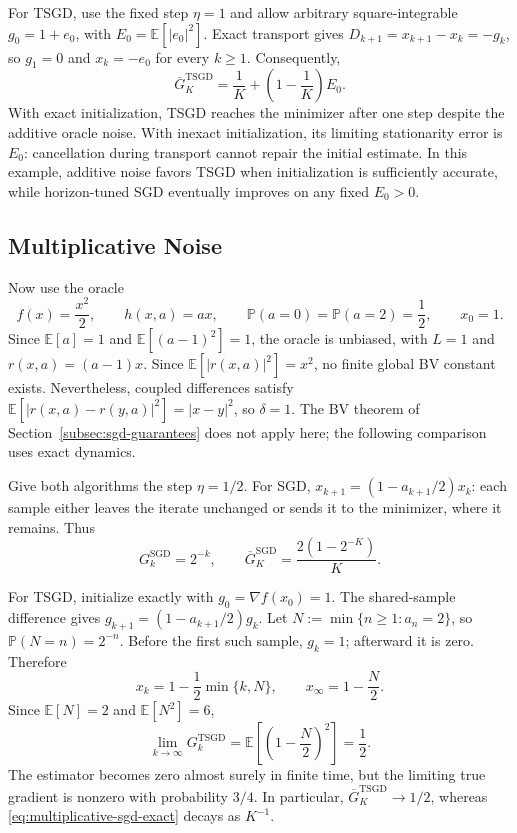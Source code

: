 For TSGD, use the fixed step $\eta=1$ and allow arbitrary
square-integrable $g_0=1+e_0$, with
$E_0=\mathbb E[|e_0|^2]$. Exact transport gives
$D_{k+1}=x_{k+1}-x_k=-g_k$, so $g_1=0$ and
$x_k=-e_0$ for every $k\geq1$. Consequently,
\begin{equation}
\label{eq:additive-tsgd-exact}
\boxed{\overline G_K^{\mathrm{TSGD}}
=\frac1K+\left(1-\frac1K\right)E_0.}
\end{equation}
With exact initialization, TSGD reaches the minimizer after one
step despite the additive oracle noise. With inexact initialization,
its limiting stationarity error is $E_0$: cancellation during
transport cannot repair the initial estimate. In this example,
additive noise favors TSGD when initialization is sufficiently
accurate, while horizon-tuned SGD eventually improves on any fixed
$E_0>0$.

\subsection{Multiplicative Noise}
\label{subsec:multiplicative-noise-comparison}

Now use the oracle
\begin{equation}
\label{eq:multiplicative-comparison-oracle}
f(x)=\frac{x^2}{2},\qquad
h(x,a)=a x,\qquad
\mathbb P(a=0)=\mathbb P(a=2)=\frac12,\qquad x_0=1.
\end{equation}
Since $\mathbb E[a]=1$ and $\mathbb E[(a-1)^2]=1$, the oracle is
unbiased, with $L=1$ and $r(x,a)=(a-1)x$. Since
$\mathbb E[|r(x,a)|^2]=x^2$, no finite global BV constant exists.
Nevertheless, coupled differences satisfy
$\mathbb E[|r(x,a)-r(y,a)|^2]=|x-y|^2$, so $\delta=1$.
The BV theorem of Section~\ref{subsec:sgd-guarantees} does not
apply here; the following comparison uses exact dynamics.

Give both algorithms the step $\eta=1/2$. For SGD,
$x_{k+1}=(1-a_{k+1}/2)x_k$: each sample either leaves the iterate
unchanged or sends it to the minimizer, where it remains. Thus
\begin{equation}
\label{eq:multiplicative-sgd-exact}
\boxed{G_k^{\mathrm{SGD}}=2^{-k},\qquad
\overline G_K^{\mathrm{SGD}}
=\frac{2(1-2^{-K})}{K}.}
\end{equation}

For TSGD, initialize exactly with $g_0=\nabla f(x_0)=1$.
The shared-sample difference gives
$g_{k+1}=(1-a_{k+1}/2)g_k$. Let
$N:=\min\{n\geq1:a_n=2\}$, so $\mathbb P(N=n)=2^{-n}$.
Before the first such sample, $g_k=1$; afterward it is zero.
Therefore
\[
x_k=1-\frac12\min\{k,N\},\qquad
x_\infty=1-\frac N2.
\]
Since $\mathbb E[N]=2$ and $\mathbb E[N^2]=6$,
\begin{equation}
\label{eq:multiplicative-tsgd-residual}
\boxed{\lim_{k\to\infty}G_k^{\mathrm{TSGD}}
=\mathbb E\!\left[\left(1-\frac N2\right)^2\right]
=\frac12.}
\end{equation}
The estimator becomes zero almost surely in finite time, but the
limiting true gradient is nonzero with probability $3/4$. In
particular, $\overline G_K^{\mathrm{TSGD}}\to1/2$, whereas
\eqref{eq:multiplicative-sgd-exact} decays as $K^{-1}$.

